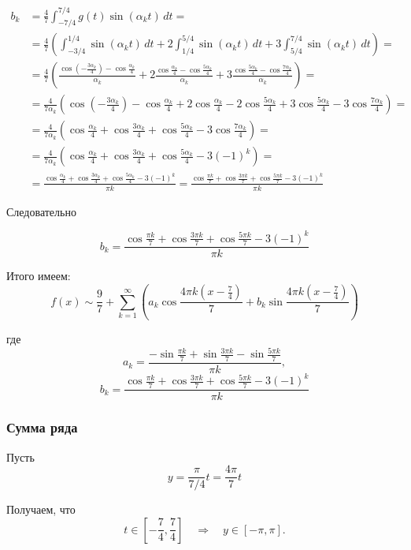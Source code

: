 \documentclass[12pt,a4paper]{article}
\begin{document}
\begin{align*}
b_k
&=
\frac47
\int_{-7/4}^{7/4}
g(t)\sin(\alpha_k t)\,dt
= \\ &=
\frac47
\left(
\int_{-3/4}^{1/4}\sin(\alpha_k t)\,dt
+
2\int_{1/4}^{5/4}\sin(\alpha_k t)\,dt
+
3\int_{5/4}^{7/4}\sin(\alpha_k t)\,dt
\right)
= \\ &=
\frac47
\left(
\frac{
\cos\left(-\frac{3\alpha_k}{4}\right)
-
\cos\frac{\alpha_k}{4}
}{\alpha_k}
+
2\frac{
\cos\frac{\alpha_k}{4}
-
\cos\frac{5\alpha_k}{4}
}{\alpha_k}
+
3\frac{
\cos\frac{5\alpha_k}{4}
-
\cos\frac{7\alpha_k}{4}
}{\alpha_k}
\right)
= \\ &=
\frac4{7\alpha_k}
\left(
\cos\left(-\frac{3\alpha_k}{4}\right)
-
\cos\frac{\alpha_k}{4}
+
2\cos\frac{\alpha_k}{4}
-
2\cos\frac{5\alpha_k}{4}
+
3\cos\frac{5\alpha_k}{4}
-
3\cos\frac{7\alpha_k}{4}
\right)
= \\ &=
\frac4{7\alpha_k}
\left(
\cos\frac{\alpha_k}{4}
+
\cos\frac{3\alpha_k}{4}
+
\cos\frac{5\alpha_k}{4}
-
3\cos\frac{7\alpha_k}{4}
\right)
= \\ &=
\frac4{7\alpha_k}
\left(
\cos\frac{\alpha_k}{4}
+
\cos\frac{3\alpha_k}{4}
+
\cos\frac{5\alpha_k}{4}
-
3(-1)^k
\right)
= \\ &=
\frac{
\cos\frac{\alpha_k}{4}
+
\cos\frac{3\alpha_k}{4}
+
\cos\frac{5\alpha_k}{4}
-
3(-1)^k
}{\pi k}
=
\frac{
\cos\frac{\pi k}{7}
+
\cos\frac{3\pi k}{7}
+
\cos\frac{5\pi k}{7}
-
3(-1)^k
}{\pi k}
\end{align*}

Следовательно

\[
b_k
=
\frac{
\cos\frac{\pi k}{7}
+
\cos\frac{3\pi k}{7}
+
\cos\frac{5\pi k}{7}
-
3(-1)^k
}{\pi k}
\]

Итого имеем:
\[
f(x)\sim
\frac97
+
\sum_{k=1}^{\infty}
\left(
a_k\cos\frac{4\pi k\left(x-\frac74\right)}{7}
+
b_k\sin\frac{4\pi k\left(x-\frac74\right)}{7}
\right)
\]

где
\[
a_k=
\frac{
-\sin\frac{\pi k}{7}
+
\sin\frac{3\pi k}{7}
-
\sin\frac{5\pi k}{7}
}{\pi k},
\]
\[
b_k=
\frac{
\cos\frac{\pi k}{7}
+
\cos\frac{3\pi k}{7}
+
\cos\frac{5\pi k}{7}
-
3(-1)^k
}{\pi k}
\]

\subsubsection*{Сумма ряда}

Пусть
\[
y=\frac{\pi}{7/4}t=\frac{4\pi}{7}t
\]

Получаем, что
\[
t\in\left[-\frac74,\frac74\right]
\quad \Rightarrow \quad
y\in[-\pi,\pi].
\]
\end{document}
